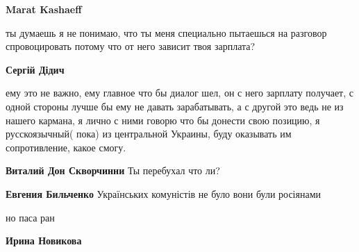 \begin{itemize}
\begin{itemize}
\textbf{Marat Kashaeff} 

ты думаешь я не понимаю, что ты меня специально пытаешься на разговор
спровоцировать потому что от него зависит твоя зарплата?


 
\textbf{Сергій Дідич} 

ему это не важно, ему главное что бы диалог шел, он с него зарплату получает, с
одной стороны лучше бы ему не давать зарабатывать, а с другой это ведь не из
нашего кармана, я лично с ними говорю что бы донести свою позицию, я
русскоязычный( пока) из центральной Украины, буду оказывать им сопротивление,
какое смогу.

 
\textbf{Виталий Дон Скворчинни} Ты перебухал что ли?

 
\textbf{Евгения Бильченко} Українських комуністів не було вони були росіянами

\end{itemize}

 
но паса ран

\begin{itemize}
 
\textbf{Ирина Новикова} 


\end{itemize}
\end{itemize}
